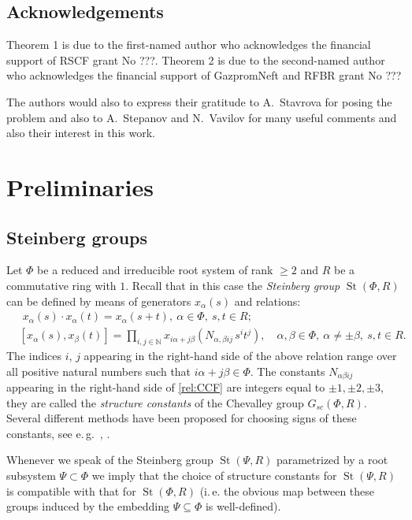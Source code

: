 \documentclass[oneside, 8pt]{amsart}
\theoremstyle{remark}
\theoremstyle{definition}
\numberwithin{lemma}{section}
\numberwithin{prop}{section}
\numberwithin{corollary}{section}
\numberwithin{externaltheorem}{section}
\DeclareMathOperator{\St}{St}
\numberwithin{equation}{section}
\begin{document}
\subsection{Acknowledgements} Theorem 1 is due to the first-named author who acknowledges the financial support of RSCF grant No ???.
Theorem 2 is due to the second-named author who acknowledges the financial support of GazpromNeft and RFBR grant No ???

The authors would also to express their gratitude to A.~Stavrova for posing the problem and also
 to A.~Stepanov and N.~Vavilov for many useful comments and also their interest in this work.


\section{Preliminaries}

\subsection{Steinberg groups}
Let $\Phi$ be a reduced and irreducible root system of rank $\geq 2$ and $R$ be a commutative ring with $1$. Recall that in this case the \emph{Steinberg group} $\St(\Phi, R)$ can be defined by means of generators $x_{\alpha}(s)$ 
and relations:
\begin{align}
& \phantom{[}
x_\alpha(s) \cdot x_\alpha(t) = x_\alpha(s+t),\ \alpha\in\Phi,\ s,t\in R; \label{rel:add}\\
& [x_\alpha(s), x_\beta(t)] = \prod\limits_{i,j\in\mathbb{N}}
 x_{i\alpha + j\beta}\left(N_{\alpha,\beta ij}\, s^i t^j\right),\quad \alpha,\beta\in\Phi,\ \alpha\neq\pm\beta,\ s,t\in R. \label{rel:CCF}
\end{align}
The indices $i$, $j$ appearing in the right-hand side of the above relation range over
all positive natural numbers such that $i\alpha + j\beta\in\Phi$.
The constants $N_{\alpha \beta i j}$ appearing in the right-hand side of \eqref{rel:CCF} are integers equal to $\pm 1,\pm 2,\pm 3$, they are called the {\it structure constants} of the Chevalley group $G_{sc}(\Phi, R)$. Several different methods have been proposed for choosing signs of these constants, see e.\,g.~\cite{V00}, \cite[\S~9]{VP}.

Whenever we speak of the Steinberg group $\St(\Psi, R)$ parametrized by a root subsystem $\Psi \subset \Phi$ we imply that the choice of structure constants 
 for $\St(\Psi, R)$ is compatible with that for $\St(\Phi, R)$ (i.\,e. the obvious map between these groups induced by the embedding $\Psi\subseteq \Phi$ is well-defined).
\end{document}
